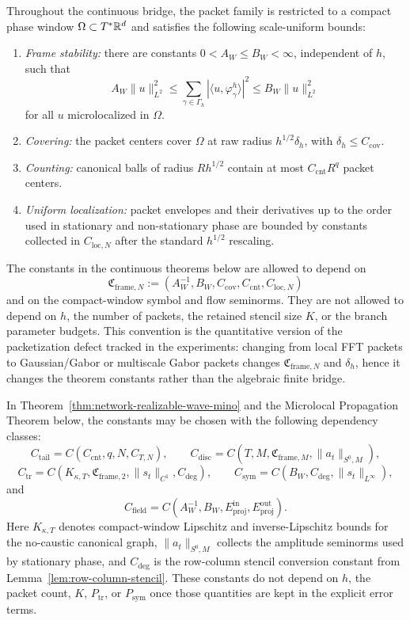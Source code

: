 \begin{assumption}
\label{ass:packet-frame-constants}
Throughout the continuous bridge, the packet family is restricted to a compact phase window $\Omega\subset T^\ast\mathbb R^d$ and satisfies the following scale-uniform bounds:
\begin{enumerate}
\item \emph{Frame stability:} there are constants $0<A_W\le B_W<\infty$, independent of $h$, such that
\[
A_W\|u\|_{L^2}^2
\le
\sum_{\gamma\in\Gamma_h}|\langle u,\varphi_\gamma^h\rangle|^2
\le
B_W\|u\|_{L^2}^2
\]
for all $u$ microlocalized in $\Omega$.
\item \emph{Covering:} the packet centers cover $\Omega$ at raw radius $h^{1/2}\delta_h$, with $\delta_h\le C_{\mathrm{cov}}$.
\item \emph{Counting:} canonical balls of radius $Rh^{1/2}$ contain at most $C_{\mathrm{cnt}}R^q$ packet centers.
\item \emph{Uniform localization:} packet envelopes and their derivatives up to the order used in stationary and non-stationary phase are bounded by constants collected in $C_{\mathrm{loc},N}$ after the standard $h^{1/2}$ rescaling.
\end{enumerate}
\end{assumption}

The constants in the continuous theorems below are allowed to depend on
\[
\mathfrak C_{\mathrm{frame},N}
:=
(A_W^{-1},B_W,C_{\mathrm{cov}},C_{\mathrm{cnt}},C_{\mathrm{loc},N})
\]
and on the compact-window symbol and flow seminorms. They are not allowed to depend on $h$, the number of packets, the retained stencil size $K$, or the branch parameter budgets. This convention is the quantitative version of the packetization defect tracked in the experiments: changing from local FFT packets to Gaussian/Gabor or multiscale Gabor packets changes $\mathfrak C_{\mathrm{frame},N}$ and $\delta_h$, hence it changes the theorem constants rather than the algebraic finite bridge.

\begin{lemma}
\label{lem:constant-ledger}
In Theorem~\ref{thm:network-realizable-wave-mino} and the Microlocal Propagation Theorem below, the constants may be chosen with the following dependency classes:
\[
C_{\mathrm{tail}}=C(C_{\mathrm{cnt}},q,N,C_{T,N}),
\qquad
C_{\mathrm{disc}}=C(T,M,\mathfrak C_{\mathrm{frame},M},\|a_t\|_{S^0,M}),
\]
\[
C_{\mathrm{tr}}=C(K_{\kappa,T},\mathfrak C_{\mathrm{frame},2},\|s_t\|_{C^1},C_{\mathrm{deg}}),
\qquad
C_{\mathrm{sym}}=C(B_W,C_{\mathrm{deg}},\|s_t\|_{L^\infty}),
\]
and
\[
C_{\mathrm{field}}=C(A_W^{-1},B_W,E^{\mathrm{in}}_{\mathrm{proj}},E^{\mathrm{out}}_{\mathrm{proj}}).
\]
Here $K_{\kappa,T}$ denotes compact-window Lipschitz and inverse-Lipschitz bounds for the no-caustic canonical graph, $\|a_t\|_{S^0,M}$ collects the amplitude seminorms used by stationary phase, and $C_{\mathrm{deg}}$ is the row-column stencil conversion constant from Lemma~\ref{lem:row-column-stencil}. These constants do not depend on $h$, the packet count, $K$, $P_{\mathrm{tr}}$, or $P_{\mathrm{sym}}$ once those quantities are kept in the explicit error terms.
\end{lemma}

